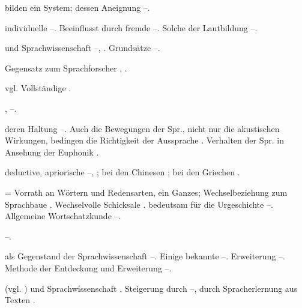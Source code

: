 \begin{register}
 bilden ein System; dessen Aneignung \pageref{sp.63}–\pageref{sp.64}.

 individuelle \pageref{sp.97}–\pageref{sp.100}. Beeinflusst durch fremde \pageref{sp.259}–\pageref{sp.260}. Solche der Lautbildung \pageref{sp.270}–\pageref{sp.271}.

 und Sprachwissenschaft \pageref{sp.29}–\pageref{sp.30}, \pageref{sp.50}. Grundsätze \pageref{sp.61}–\pageref{sp.64}.

 Gegensatz zum Sprachforscher \pageref{sp.32}, \pageref{sp.49}.

 vgl.  Vollständige \pageref{sp.111}.

  \pageref{sp.259} , \pageref{sp.406}–\pageref{sp.408}.

 deren Haltung \pageref{sp.34}–\pageref{sp.36}. Auch die Bewegungen der Spr., nicht nur die akustischen Wirkungen, bedingen die Richtigkeit der Aussprache \pageref{sp.187}. Verhalten der Spr. in Ansehung der Euphonik \pageref{sp.197}.

 deductive, apriorische \pageref{sp.11}–\pageref{sp.12}, \pageref{sp.28}; bei den Chinesen \pageref{sp.19}; bei den Griechen \pageref{sp.20}.

 = Vorrath an Wörtern und Redensarten, ein Ganzes; Wechselbeziehung zum Sprachbaue \pageref{sp.121}. Wechselvolle Schicksale \pageref{sp.152}.  bedeutsam für die Urgeschichte \pageref{sp.293}–\pageref{sp.294}. Allgemeine Wortschatzkunde \pageref{sp.481}–\pageref{sp.483}.

 \pageref{sp.476}–\pageref{sp.479}.




 als Gegenstand der Sprachwissenschaft \pageref{sp.9}–\pageref{sp.10}. Einige bekannte \pageref{sp.142}–\pageref{sp.148}. Erweiterung \pageref{sp.143}–\pageref{sp.144}. Methode der Entdeckung und Erweiterung \pageref{sp.145}–\pageref{sp.154}.


 (vgl. ) und Sprachwissenschaft \pageref{sp.48}. Steigerung durch  \pageref{sp.50}–\pageref{sp.52}, durch Spracherlernung aus Texten \pageref{sp.73}.


\end{register}
